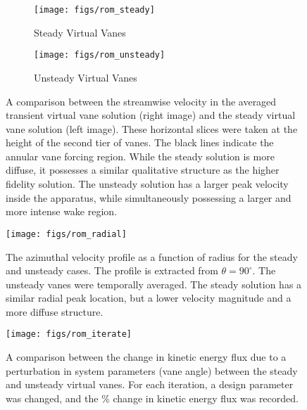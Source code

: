 \begin{figure}[htp!]
 \begin{subfigure}{0.49\textwidth}
 \centering
 \texttt{[image: figs/rom\_steady]}
  \caption{Steady Virtual Vanes}
 \end{subfigure}
 \begin{subfigure}{0.49\textwidth}
 \texttt{[image: figs/rom\_unsteady]}%
  \caption{Unsteady Virtual Vanes}
 \end{subfigure}
 \caption{A comparison between the streamwise velocity in the averaged
 transient virtual vane solution (right image) and the steady virtual
 vane solution (left image). These horizontal slices were taken at the
 height of the second tier of vanes. The black lines indicate the
 annular vane forcing region. While the steady solution is more diffuse,
 it possesses a similar qualitative structure as the higher fidelity
 solution. The unsteady solution has a larger peak velocity inside the
 apparatus, while simultaneously possessing a larger and more intense
 wake region.}
 \label{fig:rom_compare}  
\end{figure}


\begin{figure}[htp!]
 \centering
 \texttt{[image: figs/rom\_radial]}
 \caption{The azimuthal velocity profile as a function of radius for the
 steady and unsteady cases. The profile is extracted from $\theta =
 90^{\circ}$. The unsteady vanes were temporally averaged. The steady
 solution has a similar radial peak location, but a lower velocity
 magnitude and a more diffuse structure.}   
 \label{fig:rom_az}
\end{figure}



\begin{figure}[htp!]
 \centering
 \texttt{[image: figs/rom\_iterate]}
 \caption{A comparison between the change in kinetic energy flux due to
 a perturbation in system parameters (vane angle) between the steady and
 unsteady virtual vanes. For each iteration, a design parameter was
 changed, and the \% change in kinetic energy flux was recorded.}    
 \label{fig:rom_it}  
\end{figure}

